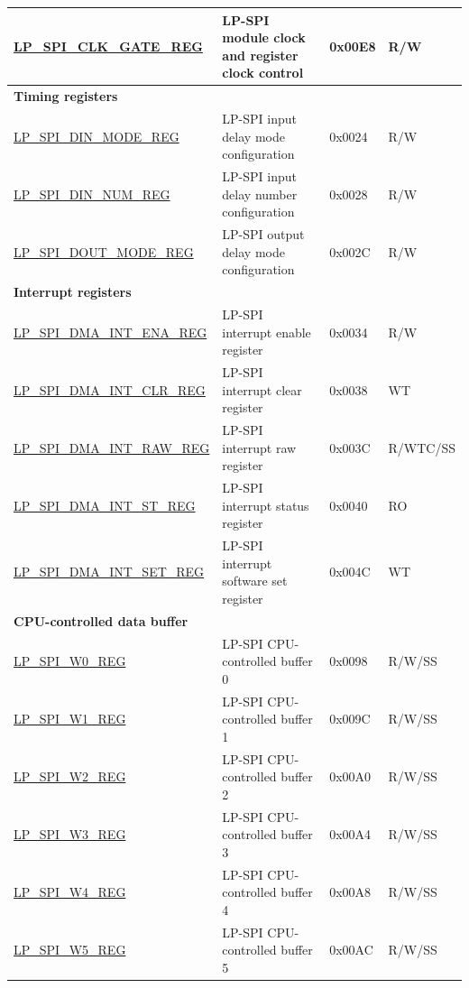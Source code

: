 \begin{longtable}{ | p{6cm} | p{7.2cm} | p{1.3cm} | p{1cm} | }
\hyperref[regdesc:LPSPICLKGATEREG]{LP\_SPI\_CLK\_GATE\_REG} & LP-SPI module clock and register clock control & 0x00E8 & R/W \\ \hline
\multicolumn{4}{|l|}{\textbf{Timing registers}} \\ \hline
\hyperref[regdesc:LPSPIDINMODEREG]{LP\_SPI\_DIN\_MODE\_REG} & LP-SPI input delay mode configuration & 0x0024 & R/W \\ \hline
\hyperref[regdesc:LPSPIDINNUMREG]{LP\_SPI\_DIN\_NUM\_REG} & LP-SPI input delay number configuration & 0x0028 & R/W \\ \hline
\hyperref[regdesc:LPSPIDOUTMODEREG]{LP\_SPI\_DOUT\_MODE\_REG} & LP-SPI output delay mode configuration & 0x002C & R/W \\ \hline
\multicolumn{4}{|l|}{\textbf{Interrupt registers}} \\ \hline
\hyperref[regdesc:LPSPIDMAINTENAREG]{LP\_SPI\_DMA\_INT\_ENA\_REG} & LP-SPI interrupt enable register & 0x0034 & R/W \\ \hline
\hyperref[regdesc:LPSPIDMAINTCLRREG]{LP\_SPI\_DMA\_INT\_CLR\_REG} & LP-SPI interrupt clear register & 0x0038 & WT \\ \hline
\hyperref[regdesc:LPSPIDMAINTRAWREG]{LP\_SPI\_DMA\_INT\_RAW\_REG} & LP-SPI interrupt raw register & 0x003C & R/WTC/SS \\ \hline
\hyperref[regdesc:LPSPIDMAINTSTREG]{LP\_SPI\_DMA\_INT\_ST\_REG} & LP-SPI interrupt status register & 0x0040 & RO \\ \hline
\hyperref[regdesc:LPSPIDMAINTSETREG]{LP\_SPI\_DMA\_INT\_SET\_REG} & LP-SPI interrupt software set register & 0x004C & WT \\ \hline
\multicolumn{4}{|l|}{\textbf{CPU-controlled data buffer}} \\ \hline
\hyperref[regdesc:LPSPIW0REG]{LP\_SPI\_W0\_REG} & LP-SPI CPU-controlled buffer 0 & 0x0098 & R/W/SS \\ \hline
\hyperref[regdesc:LPSPIW1REG]{LP\_SPI\_W1\_REG} & LP-SPI CPU-controlled buffer 1 & 0x009C & R/W/SS \\ \hline
\hyperref[regdesc:LPSPIW2REG]{LP\_SPI\_W2\_REG} & LP-SPI CPU-controlled buffer 2 & 0x00A0 & R/W/SS \\ \hline
\hyperref[regdesc:LPSPIW3REG]{LP\_SPI\_W3\_REG} & LP-SPI CPU-controlled buffer 3 & 0x00A4 & R/W/SS \\ \hline
\hyperref[regdesc:LPSPIW4REG]{LP\_SPI\_W4\_REG} & LP-SPI CPU-controlled buffer 4 & 0x00A8 & R/W/SS \\ \hline
\hyperref[regdesc:LPSPIW5REG]{LP\_SPI\_W5\_REG} & LP-SPI CPU-controlled buffer 5 & 0x00AC & R/W/SS \\ \hline

\end{longtable}

